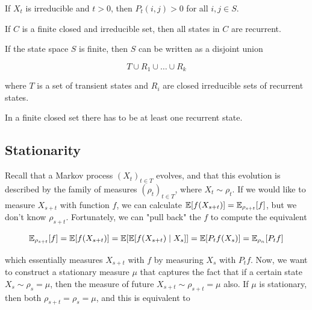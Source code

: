 	\begin{lemma}
		\label{thm:positivity-of-the-transition-semigroup}
		If $X_t$ is irreducible and $t > 0$, then $P_t (i, j) > 0$ for all $i, j \in S$. 
	\end{lemma}

	\begin{theorem}
		\label{thm:finite-closed-irreducible-sets-are-recurrent}
		If $C$ is a finite closed and irreducible set, then all states in $C$ are recurrent. 
	\end{theorem}

	\begin{theorem}
		\label{thm:decomposition}
		If the state space $S$ is finite, then $S$ can be written as a disjoint union 

			\begin{equation}
				T \cup R_1 \cup \ldots \cup R_k
			\end{equation}

		where $T$ is a set of transient states and $R_i$ are closed irreducible sets of recurrent states. 
	\end{theorem}

	\begin{lemma}
		\label{thm:existence-of-a-recurrent-state-in-a-finite}
		In a finite closed set there has to be at least one recurrent state. 
	\end{lemma}

\subsection{Stationarity} 
	
	Recall that a Markov process $(X_t)_{t \in T}$ evolves, and that this evolution is described by the family of measures $(\rho_t)_{t \in T}$, where $X_t \sim \rho_t$. If we would like to measure $X_{s + t}$ with function $f$, we can calculate $\operatorname{\mathbb{E}}[f(X_{s + t})] = \operatorname{\mathbb{E}}_{\rho_{s + t}} [f]$, but we don't know $\rho_{s + t}$. Fortunately, we can "pull back" the $f$ to compute the equivalent 

	\begin{equation}
		\operatorname{\mathbb{E}}_{\rho_{s + t}} [f] = \operatorname{\mathbb{E}}[f(X_{s + t})] = \operatorname{\mathbb{E}}[\operatorname{\mathbb{E}}[ f(X_{s + t}) \mid X_s]] = \operatorname{\mathbb{E}}[P_t f (X_s)] = \operatorname{\mathbb{E}}_{\rho_{n}} [ P_t f]
	\end{equation}

	which essentially measures $X_{s + t}$ with $f$ by measuring $X_s$ with $P_t f$. Now, we want to construct a stationary measure $\mu$ that captures the fact that if a certain state $X_s \sim \rho_s = \mu$, then the measure of future $X_{s + t} \sim \rho_{s + t} = \mu$ also. If $\mu$ is stationary, then both $\rho_{s + t} = \rho_s = \mu$, and this is equivalent to

